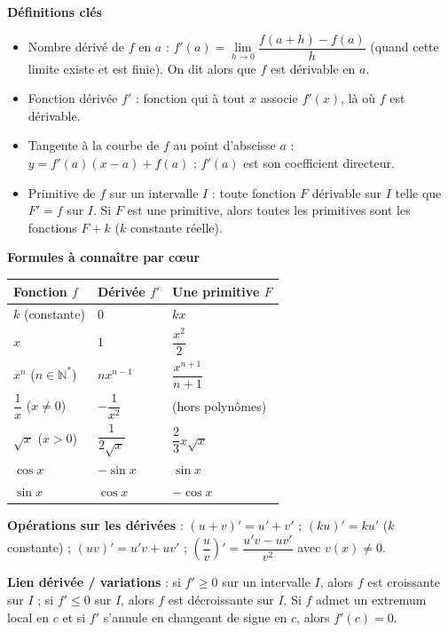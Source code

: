 \documentclass[11pt]{article}
\newcommand{\cle}[1]{{\popxbold\color{popdark}#1}}
\begin{document}
\begin{aretenir}
\textbf{Définitions clés}
\begin{itemize}
  \item \cle{Nombre dérivé} de $f$ en $a$ : $f'(a)=\lim\limits_{h\to0}\dfrac{f(a+h)-f(a)}{h}$ (quand cette limite existe et est finie). On dit alors que $f$ est \cle{dérivable} en $a$.
  \item \cle{Fonction dérivée} $f'$ : fonction qui à tout $x$ associe $f'(x)$, là où $f$ est dérivable.
  \item \cle{Tangente} à la courbe de $f$ au point d'abscisse $a$ : $y=f'(a)(x-a)+f(a)$ ; $f'(a)$ est son coefficient directeur.
  \item \cle{Primitive} de $f$ sur un intervalle $I$ : toute fonction $F$ dérivable sur $I$ telle que $F'=f$ sur $I$. Si $F$ est une primitive, alors toutes les primitives sont les fonctions $F+k$ ($k$ constante réelle).
\end{itemize}

\textbf{Formules à connaître par c\oe ur}
\begin{center}
\begin{tabularx}{\linewidth}{|l|X|X|}\hline
\rowcolor{popblueL} \textbf{Fonction $f$} & \textbf{Dérivée $f'$} & \textbf{Une primitive $F$} \\ \hline
$k$ (constante) & $0$ & $kx$ \\ \hline
$x$ & $1$ & $\dfrac{x^{2}}{2}$ \\ \hline
$x^{n}$ ($n\in\mathbb{N}^{*}$) & $nx^{n-1}$ & $\dfrac{x^{n+1}}{n+1}$ \\ \hline
$\dfrac{1}{x}$ ($x\neq0$) & $-\dfrac{1}{x^{2}}$ & (hors polynômes) \\ \hline
$\sqrt{x}$ ($x>0$) & $\dfrac{1}{2\sqrt{x}}$ & $\dfrac{2}{3}x\sqrt{x}$ \\ \hline
$\cos x$ & $-\sin x$ & $\sin x$ \\ \hline
$\sin x$ & $\cos x$ & $-\cos x$ \\ \hline
\end{tabularx}
\end{center}

\textbf{Opérations sur les dérivées} : $(u+v)'=u'+v'$ ; $(ku)'=ku'$ ($k$ constante) ; $(uv)'=u'v+uv'$ ; $\left(\dfrac{u}{v}\right)'=\dfrac{u'v-uv'}{v^{2}}$ avec $v(x)\neq0$.

\textbf{Lien dérivée / variations} : si $f'\geq0$ sur un intervalle $I$, alors $f$ est croissante sur $I$ ; si $f'\leq0$ sur $I$, alors $f$ est décroissante sur $I$. Si $f$ admet un extremum local en $c$ et si $f'$ s'annule en changeant de signe en $c$, alors $f'(c)=0$.


\end{aretenir}
\end{document}
